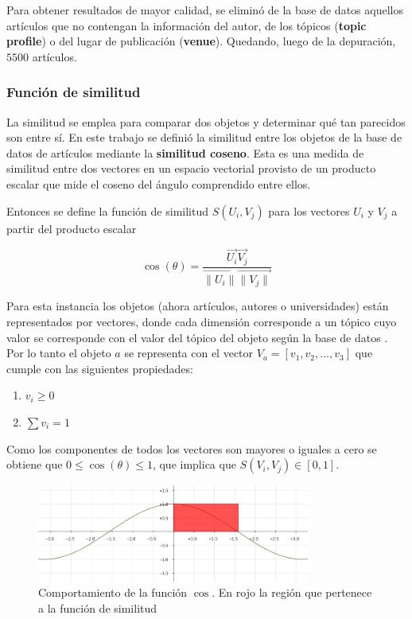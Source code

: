 Para obtener resultados de mayor calidad, se eliminó de la base de datos aquellos artículos que no contengan la información del autor, de los tópicos (\textbf{topic profile}) o del lugar de publicación (\textbf{venue}). Quedando, luego de la depuración, $5500$ artículos.  

\subsubsection{Función de similitud}
La similitud se emplea para comparar dos objetos y determinar qué tan parecidos son entre sí. En este trabajo se definió la similitud entre los objetos de la base de datos de artículos mediante la \textbf{similitud coseno}. Esta es una medida de similitud entre dos vectores en un espacio vectorial provisto de un producto escalar que mide el coseno del ángulo comprendido entre ellos.

Entonces se define la función de similitud $S(U_i, V_j)$ para los vectores $U_i$ y $V_j$ a partir del producto escalar

\begin{equation} \label{eq:angulovectorial}
\cos(\theta) =  \dfrac{\overrightarrow{U_i} \overrightarrow{V_j}}{\overrightarrow{\lVert U_i\lVert} \overrightarrow{\lVert V_j\lVert}}
\end{equation}

Para esta instancia los objetos (ahora artículos, autores o universidades) están representados por vectores, donde cada dimensión corresponde a un tópico cuyo valor se corresponde con el valor del tópico del objeto según la base de datos \cite{dataDrive}. Por lo tanto el objeto $a$ se representa con el vector $V_a = [v_1,v_2,...,v_3]$ que cumple con las siguientes propiedades:
\begin{enumerate}
 \item $v_i \geq 0$
 \item $\sum{v_i} = 1$
\end{enumerate}

Como los componentes de todos los vectores son mayores o iguales a cero se obtiene que $0\leq\cos(\theta)\leq1$, que implica que $S(V_i, V_j) \in \left[0, 1\right]$.

\begin{figure}[H]
\includegraphics[width=0.8\textwidth]{img/coseno.png}
\caption{Comportamiento de la función $\cos$. En rojo la región que pertenece a la función de similitud}
\label{bus:img-coseno}
\end{figure}

